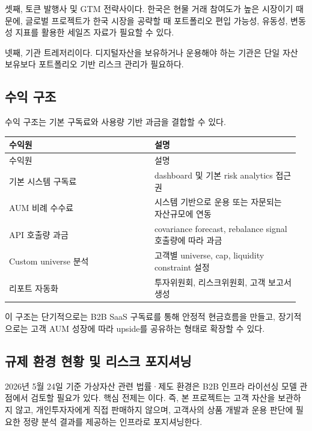 \documentclass[12pt,a4paper]{article}
\begin{document}
셋째, 토큰 발행사 및 GTM 전략사이다. 한국은 현물 거래 참여도가 높은 시장이기 때문에, 글로벌 프로젝트가 한국 시장을 공략할 때 포트폴리오 편입 가능성, 유동성, 변동성 지표를 활용한 세일즈 자료가 필요할 수 있다.

넷째, 기관 트레저리이다. 디지털자산을 보유하거나 운용해야 하는 기관은 단일 자산 보유보다 포트폴리오 기반 리스크 관리가 필요하다.

\subsection{수익 구조}

수익 구조는 기본 구독료와 사용량 기반 과금을 결합할 수 있다.

\begin{center}
\small
\begin{longtable}{@{}p{0.48\linewidth}p{0.48\linewidth}@{}}
\toprule
수익원 & 설명 \\
\midrule
\endfirsthead
\toprule
수익원 & 설명 \\
\midrule
\endhead
기본 시스템 구독료 & dashboard 및 기본 risk analytics 접근권 \\
AUM 비례 수수료 & 시스템 기반으로 운용 또는 자문되는 자산규모에 연동 \\
API 호출량 과금 & covariance forecast, rebalance signal 호출량에 따라 과금 \\
Custom universe 분석 & 고객별 universe, cap, liquidity constraint 설정 \\
리포트 자동화 & 투자위원회, 리스크위원회, 고객 보고서 생성 \\
\bottomrule
\end{longtable}
\end{center}

이 구조는 단기적으로는 B2B SaaS 구독료를 통해 안정적 현금흐름을 만들고, 장기적으로는 고객 AUM 성장에 따라 upside를 공유하는 형태로 확장할 수 있다.

\subsection{규제 환경 현황 및 리스크 포지셔닝}

2026년 5월 24일 기준 가상자산 관련 법률·제도 환경은 B2B 인프라 라이선싱 모델 관점에서 검토할 필요가 있다. 핵심 전제는 \texttt{}이다. 즉, 본 프로젝트는 고객 자산을 보관하지 않고, 개인투자자에게 직접 판매하지 않으며, 고객사의 상품 개발과 운용 판단에 필요한 정량 분석 결과를 제공하는 인프라로 포지셔닝한다.
\end{document}
